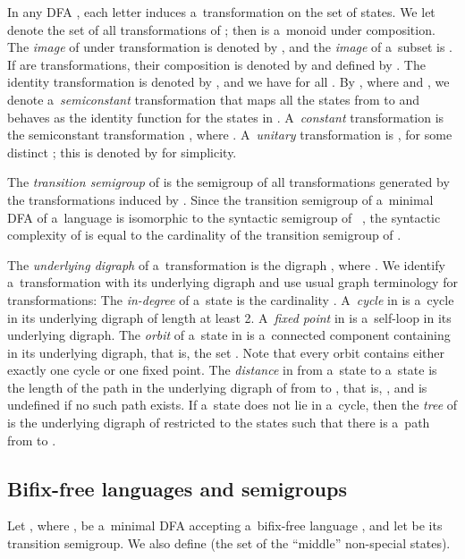 \documentclass{amsart}
\begin{document}
In any DFA , each letter  induces a~transformation on the set  of  states.
We let  denote the set of all  transformations of ; then  is a~monoid under composition. 
The \emph{image} of  under transformation  is denoted by , and the \emph{image} of a~subset  is .
If  are transformations, their composition is denoted by  and defined by .
The identity transformation is denoted by , and we have  for all .
By , where  and , we denote a~\emph{semiconstant} transformation that maps all the
states from  to  and behaves as the identity function for the states in .
A~\emph{constant} transformation is the semiconstant transformation , where .
A~\emph{unitary} transformation is , for some distinct ; this is denoted by  for simplicity.

The \emph{transition semigroup} of  is the semigroup of all transformations generated by the transformations induced by .
Since the transition semigroup of a~minimal DFA of a~language  is isomorphic to the syntactic semigroup of ~\cite{Pin97}, the syntactic complexity of  is equal to the cardinality of the transition semigroup of .

The \emph{underlying digraph} of a~transformation  is the digraph , where .
We identify a~transformation with its underlying digraph and use usual graph terminology for transformations:
The \emph{in-degree} of a~state  is the cardinality .
A~\emph{cycle} in  is a~cycle in its underlying digraph of length at least 2.
A~\emph{fixed point} in  is a~self-loop in its underlying digraph.
The \emph{orbit} of a~state  in  is a~connected component containing  in its underlying digraph, that is, the set .
Note that every orbit contains either exactly one cycle or one fixed point.
The \emph{distance} in  from a~state  to a~state  is the length of the path in the underlying digraph of  from  to , that is, , and is undefined if no such path exists.
If a~state  does not lie in a~cycle, then the \emph{tree} of  is the underlying digraph of  restricted to the states  such that there is a~path from  to .

\subsection{Bifix-free languages and semigroups}

Let , where , be a~minimal DFA accepting a~bifix-free language , and let  be its transition semigroup. We also define  (the set of the ``middle'' non-special states).
\end{document}
